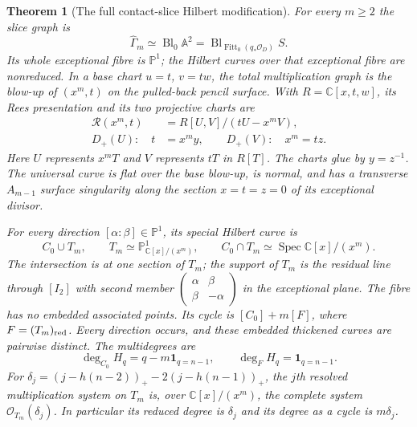 \documentclass[11pt,reqno]{amsart}
\numberwithin{equation}{section}
\newtheorem{theorem}{Theorem}[section]
\theoremstyle{definition}\newtheorem{definition}[theorem]{Definition}
\theoremstyle{remark}\newtheorem{remark}[theorem]{Remark}
\newcommand{\C}{\mathbb C}\newcommand{\Q}{\mathbb Q}
\newcommand{\Pj}{\mathbb P}\newcommand{\A}{\mathbb A}
\newcommand{\OO}{\mathcal O}\newcommand{\II}{\mathcal I}
\DeclareMathOperator{\Fitt}{Fitt}\DeclareMathOperator{\Ann}{Ann}
\DeclareMathOperator{\Spec}{Spec}\DeclareMathOperator{\PGL}{PGL}
\begin{document}
\begin{theorem}[The full contact-slice Hilbert modification]
\label{thm:contact-hilbert-v161}
For every $m\geq2$ the slice graph is
\begin{equation}\label{eq:contact-base-blowup-v161}
 \widehat\Gamma_m\simeq\operatorname{Bl}_0\A^2
     =\operatorname{Bl}_{\Fitt_0(q_*\OO_D)}S.
\end{equation}
Its whole exceptional fibre is $\Pj^1$; the Hilbert curves over
that exceptional fibre are nonreduced. In a base chart $u=t$, $v=tw$,
the total multiplication graph is the blow-up of $(x^m,t)$ on the
pulled-back pencil surface. With $R=\C[x,t,w]$, its Rees presentation
and its two projective charts are
\begin{equation}\label{eq:contact-rees-v161}
 \begin{aligned}
 \mathcal R(x^m,t)&=R[U,V]/(tU-x^m V),\\
 D_+(U):\quad t&=x^m y,\qquad D_+(V):\quad x^m=t z.
 \end{aligned}
\end{equation}
Here $U$ represents $x^mT$ and $V$ represents $tT$ in $R[T]$.
The charts glue by $y=z^{-1}$. The universal curve is flat over the
base blow-up, is normal, and has a transverse $A_{m-1}$ surface
singularity along the section $x=t=z=0$ of its exceptional divisor.

For every direction $[\alpha:\beta]\in\Pj^1$, its special Hilbert
curve is
\begin{equation}\label{eq:thick-fibre-v161}
 C_0\cup T_m,\qquad
 T_m\simeq\Pj^1_{\C[x]/(x^m)},\qquad
 C_0\cap T_m\simeq\Spec\C[x]/(x^m).
\end{equation}
The intersection is at one section of $T_m$; the support of $T_m$
is the residual line through $[I_2]$ with second member
$\left(\begin{smallmatrix}\alpha&\beta\\\beta&-\alpha\end{smallmatrix}\right)$
in the exceptional plane. The fibre has no embedded associated points.
Its cycle is $[C_0]+m[F]$, where $F=(T_m)_{\rm red}$. Every direction
occurs, and these embedded thickened curves are pairwise distinct.
The multidegrees are
\[
 \deg_{C_0}H_q=q-m\mathbf1_{q=n-1},\qquad
 \deg_F H_q=\mathbf1_{q=n-1}.
\]
For $\delta_j=(j-h(n-2))_+-2(j-h(n-1))_+$, the $j$th resolved
multiplication system on $T_m$ is, over $\C[x]/(x^m)$, the complete
system $\OO_{T_m}(\delta_j)$. In particular its reduced degree is
$\delta_j$ and its degree as a cycle is $m\delta_j$.
\end{theorem}
\end{document}
